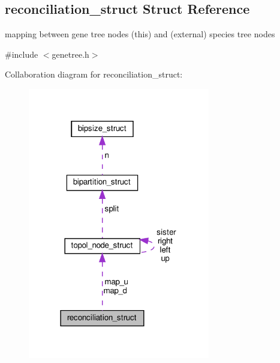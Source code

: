 \hypertarget{structreconciliation__struct}{}\subsection{reconciliation\+\_\+struct Struct Reference}
\label{structreconciliation__struct}


mapping between gene tree nodes (this) and (external) species tree nodes  




{\ttfamily \#include $<$genetree.\+h$>$}



Collaboration diagram for reconciliation\+\_\+struct\+:\nopagebreak
\begin{figure}[H]
\begin{center}
\leavevmode
\includegraphics[width=225pt]{structreconciliation__struct__coll__graph}
\end{center}
\end{figure}
